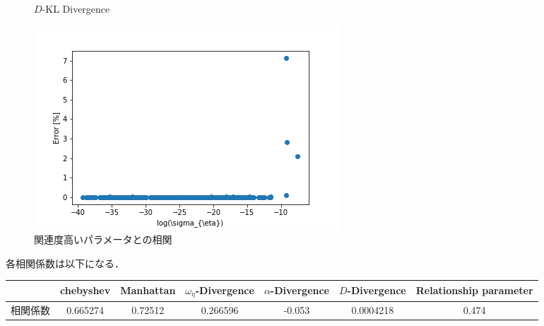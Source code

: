 \documentclass[16.7pt]{jsarticle}
\begin{document}
\begin{figure}[h]
\begin{minipage}{0.45\hsize}
				\caption{$ D $-KL Divergence}
			\end{minipage}
		\begin{minipage}{0.45\hsize}
			\centering
			\includegraphics[width= 0.85\columnwidth]{./figure/sigma_eta.png}
			\caption{関連度高いパラメータとの相関}
		\end{minipage}
		\end{figure}
		各相関係数は以下になる．
		\begin{table}[h]
			\begin{tabular}{|c|c|c|c|c|c|c|}
				\hline
				& chebyshev & Manhattan &$\omega_{\eta}$-Divergence & $\alpha$-Divergence & $D$-Divergence & Relationship parameter \\ \hline
				相関係数 & 0.665274  & 0.72512  & 0.266596           & -0.053            & 0.0004218        & 0.474                  \\ \hline
			\end{tabular}
		\end{table}
		
		
		
\end{document}
